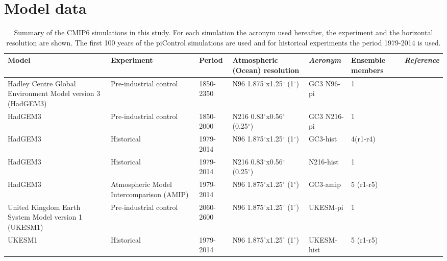 \section{Model data}\label{sq:modeldata}
\begin{sidewaystable}
\small
\caption{Summary of the CMIP6 simulations in this study. For each simulation the acronym used hereafter, the experiment and the horizontal resolution are shown. The first 100 years of the piControl simulations are used and for historical experiments the period 1979-2014 is used.}
\begin{tabular}{p{4.5cm}|p{}p{}p{2.95cm}p{2.53cm}p{2cm}p{3.8cm}} \label{tab:Sexps} \small
 Model & Experiment & Period & Atmospheric (Ocean) resolution & \textit{Acronym}  & Ensemble members & \textit{Reference}                 \\ \hline \hline

Hadley Centre Global Environment Model version 3 (HadGEM3)    &  Pre-industrial control  & 1850-2350 & N96 1.875$^\circ$x1.25$^\circ$ (1$^\circ$) & GC3 N96-pi      & 1 &   \citep{menary2018,gc3pi}                          \\
HadGEM3   &  Pre-industrial control & 1850-2000        & N216 0.83$^\circ$x0.56$^\circ$ (0.25$^\circ$) & GC3 N216-pi   & 1 & \citep{menary2018,n216pi}      \\
HadGEM3    &  Historical & 1979-2014       & N96 1.875$^\circ$x1.25$^\circ$ (1$^\circ$)  & GC3-hist     &  4(r1-r4) & \citep{andrews2020,gc3hist}                          \\
HadGEM3   &  Historical & 1979-2014        & N216 0.83$^\circ$x0.56$^\circ$ (0.25$^\circ$) & N216-hist   & 1 & \citep{n216pi}      \\
HadGEM3    &  Atmospheric Model Intercomparison (AMIP)  & 1979-2014 & N96 1.875$^\circ$x1.25$^\circ$ (1$^\circ$)  & GC3-amip   & 5 (r1-r5) &   \citep{gc3amip}                          \\
United Kingdom Earth System Model version 1 (UKESM1)   &  Pre-industrial control  & 2060-2600       & N96 1.875$^\circ$x1.25$^\circ$ (1$^\circ$) & UKESM-pi      & 1 & \citep{ukesmpi}            \\
UKESM1   &  Historical  & 1979-2014       & N96 1.875$^\circ$x1.25$^\circ$ (1$^\circ$) & UKESM-hist & 5 (r1-r5)     &  \citep{ukesmhist}            \\
\end{tabular}
\end{sidewaystable}

